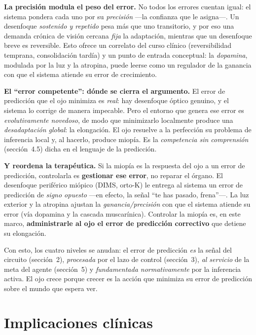 \documentclass[11pt,a4paper]{article}
\begin{document}
\textbf{La precisión modula el peso del error.} No todos los errores cuentan igual: el sistema pondera cada uno por su \emph{precisión} ---la confianza que le asigna---. Un desenfoque \emph{sostenido y repetido} pesa más que uno transitorio, y por eso una demanda crónica de visión cercana \emph{fija} la adaptación, mientras que un desenfoque breve es reversible. Esto ofrece un correlato del curso clínico (reversibilidad temprana, consolidación tardía) y un punto de entrada conceptual: la \emph{dopamina}, modulada por la luz y la atropina, puede leerse como un regulador de la ganancia con que el sistema atiende su error de crecimiento.

\textbf{El \enquote{error competente}: dónde se cierra el argumento.} El error de predicción que el ojo minimiza es \emph{real}: hay desenfoque óptico genuino, y el sistema lo corrige de manera impecable. Pero el entorno que genera ese error es \emph{evolutivamente novedoso}, de modo que minimizarlo localmente produce una \emph{desadaptación global}: la elongación. El ojo resuelve a la perfección su problema de inferencia local y, al hacerlo, produce miopía. Es la \emph{competencia sin comprensión} (sección~4.5) dicha en el lenguaje de la predicción.

\textbf{Y reordena la terapéutica.} Si la miopía es la respuesta del ojo a un error de predicción, controlarla es \textbf{gestionar ese error}, no reparar el órgano. El desenfoque periférico miópico (DIMS, orto-K) le entrega al sistema un error de predicción de \emph{signo opuesto} ---en efecto, la señal \enquote{te has pasado, frena}---. La luz exterior y la atropina ajustan la \emph{ganancia/precisión} con que el sistema atiende su error (vía dopamina y la cascada muscarínica). Controlar la miopía es, en este marco, \textbf{administrarle al ojo el error de predicción correctivo} que detiene su elongación.

Con esto, los cuatro niveles se anudan: el error de predicción \emph{es} la señal del circuito (sección~2), \emph{procesada} por el lazo de control (sección~3), \emph{al servicio} de la meta del agente (sección~5) y \emph{fundamentada normativamente} por la inferencia activa. El ojo crece porque crecer es la acción que minimiza su error de predicción sobre el mundo que espera ver.

\section{Implicaciones clínicas}
\end{document}
